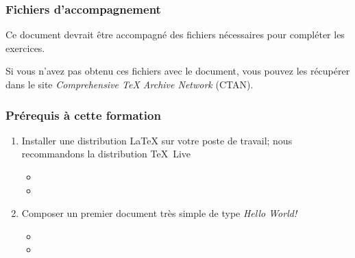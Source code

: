 
\begin{frame}
  \frametitle{Fichiers d'accompagnement}

  \begin{adjustwidth}{10mm}{10mm}
    Ce document devrait être accompagné des fichiers nécessaires pour
    compléter les exercices.

    Si vous n'avez pas obtenu ces fichiers avec le document, vous
    pouvez les récupérer dans le site \emph{Comprehensive TeX Archive
      Network} (CTAN).

    \begin{center}
    \end{center}
  \end{adjustwidth}
\end{frame}

\begin{frame}
  \frametitle{Prérequis à cette formation}

  \begin{adjustwidth}{8mm}{10mm}
    \begin{enumerate}
    \item Installer une distribution {\LaTeX} sur votre poste de
      travail; nous recommandons la distribution {\TeX}~Live
      \begin{itemize}
      \item {}
      \item {}
      \end{itemize}
    \item Composer un premier document très simple de type \emph{Hello
        World!}
      \begin{itemize}
        \normalsize
      \item {}
      \item {}
      \end{itemize}
    \end{enumerate}
  \end{adjustwidth}
\end{frame}

